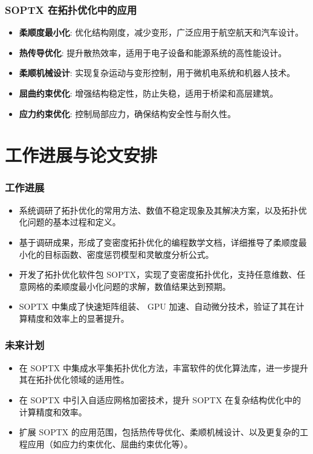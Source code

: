 \documentclass{beamer}  %
\numberwithin{subsection}{section}             %
\begin{document}
\begin{frame}
\frametitle{SOPTX 在拓扑优化中的应用}
\small{
	\begin{itemize}
		\item \textbf{柔顺度最小化}: 优化结构刚度，减少变形，广泛应用于航空航天和汽车设计。
		
		\item \textbf{热传导优化}: 提升散热效率，适用于电子设备和能源系统的高性能设计。
		
		\item \textbf{柔顺机械设计}: 实现复杂运动与变形控制，用于微机电系统和机器人技术。
		
		\item \textbf{屈曲约束优化}: 增强结构稳定性，防止失稳，适用于桥梁和高层建筑。
		
		\item \textbf{应力约束优化}: 控制局部应力，确保结构安全性与耐久性。
	\end{itemize}
}
\end{frame}



\section{工作进展与论文安排}
\begin{frame}
\frametitle{工作进展}
\small{
\begin{itemize}
	\item 系统调研了拓扑优化的常用方法、数值不稳定现象及其解决方案，以及拓扑优化问题的基本过程和定义。
	
	\item 基于调研成果，形成了变密度拓扑优化的编程数学文档，详细推导了柔顺度最小化的目标函数、密度惩罚模型和灵敏度分析公式。
	
	\item 开发了拓扑优化软件包 SOPTX，实现了变密度拓扑优化，支持任意维数、任意网格的柔顺度最小化问题的求解，数值结果达到预期。
	
	\item SOPTX 中集成了快速矩阵组装、 GPU 加速、自动微分技术，验证了其在计算精度和效率上的显著提升。
\end{itemize}
}
\end{frame}

\begin{frame}
\frametitle{未来计划}
\small{
\begin{itemize}
	\item 在 SOPTX 中集成水平集拓扑优化方法，丰富软件的优化算法库，进一步提升其在拓扑优化领域的适用性。
	
	\item 在 SOPTX 中引入自适应网格加密技术，提升 SOPTX 在复杂结构优化中的计算精度和效率。
	
	\item 扩展 SOPTX 的应用范围，包括热传导优化、柔顺机械设计、以及更复杂的工程应用（如应力约束优化、屈曲约束优化等）。
\end{itemize}
}
\end{frame}
\end{document}
